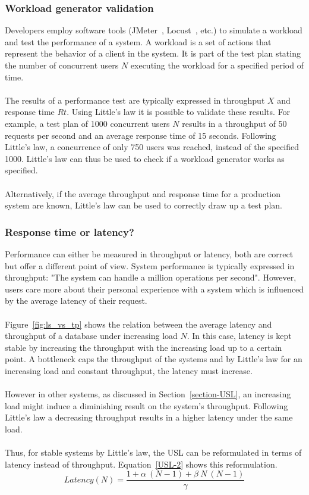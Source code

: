 \subsubsection{Workload generator validation}
Developers employ software tools (JMeter~\cite{jmeter}, Locust~\cite{locust}, etc.)  to simulate a workload and test the performance of a system. A workload is a set of actions that represent the behavior of a client in the system. It is part of the test plan stating the number of concurrent users $N$ executing the workload for a specified period of time.\\\\
The results of a performance test are typically expressed in throughput $X$ and response time $Rt$. Using Little's law it is possible to validate these results. For example, a test plan of 1000 concurrent users $N$ results in a throughput of 50 requests per second and an average response time of 15 seconds. Following Little's law, a concurrence of only 750 users was reached, instead of the specified 1000. Little's law can thus be used to check if a workload generator works as specified.\\\\
Alternatively, if the average throughput and response time for a production system are known, Little's law can be used to correctly draw up a test plan.

\subsubsection{Response time or latency?}
Performance can either be measured in throughput or latency, both are correct but offer a different point of view. System performance is typically expressed in throughput: "The system can handle a million operations per second". However, users care more about their personal experience with a system which is influenced by the average latency of their request.~\cite{schwarz2015practical} \\\\
Figure~\ref{fig:ls_vs_tp} shows the relation between the average latency and throughput of a database under increasing load $N$. In this case, latency is kept stable by increasing the throughput with the increasing load up to a certain point.  A bottleneck caps the throughput of the systems and by Little's law for an increasing load and constant throughput, the latency must increase.~\cite{latvsthrough} \\\\
However in other systems, as discussed in Section~\ref{section-USL}, an increasing load might induce a diminishing result on the system's throughput. Following Little's law a decreasing throughput results in a higher latency under the same load. \\\\
Thus, for stable systems by Little's law,  the USL can be reformulated in terms of latency instead of throughput. Equation~\ref{USL-2} shows this reformulation.~\cite{schwarz2015practical}
\begin{equation}
\label{USL-2}
Latency(N) = \frac{1 + \alpha~(N-1) + \beta~N~(N-1)}{\gamma}
\end{equation}


